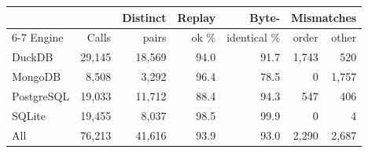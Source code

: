 \begin{tabular}{@{}lrrrrrr@{}}
\toprule
 & & Distinct & Replay & Byte- & \multicolumn{2}{c}{Mismatches} \\ \cmidrule(l){6-7}
Engine & Calls & pairs & ok \% & identical \% & order & other \\
\midrule
DuckDB & 29,145 & 18,569 & 94.0 & 91.7 & 1,743 & 520 \\
MongoDB & 8,508 & 3,292 & 96.4 & 78.5 & 0 & 1,757 \\
PostgreSQL & 19,033 & 11,712 & 88.4 & 94.3 & 547 & 406 \\
SQLite & 19,455 & 8,037 & 98.5 & 99.9 & 0 & 4 \\
\midrule
All & 76,213 & 41,616 & 93.9 & 93.0 & 2,290 & 2,687 \\
\bottomrule
\end{tabular}
